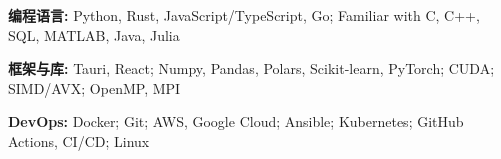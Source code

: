 \begin{enumerate}[label={[\arabic*]},nosep]
  \item \textbf{编程语言:} Python, Rust, JavaScript/TypeScript, Go; Familiar with C, C++, SQL, MATLAB, Java, Julia
  \item \textbf{框架与库:} Tauri, React; Numpy, Pandas, Polars, Scikit-learn, PyTorch; CUDA; SIMD/AVX; OpenMP, MPI
  \item \textbf{DevOps:} Docker; Git; AWS, Google Cloud; Ansible; Kubernetes; GitHub Actions, CI/CD; Linux
\end{enumerate}
